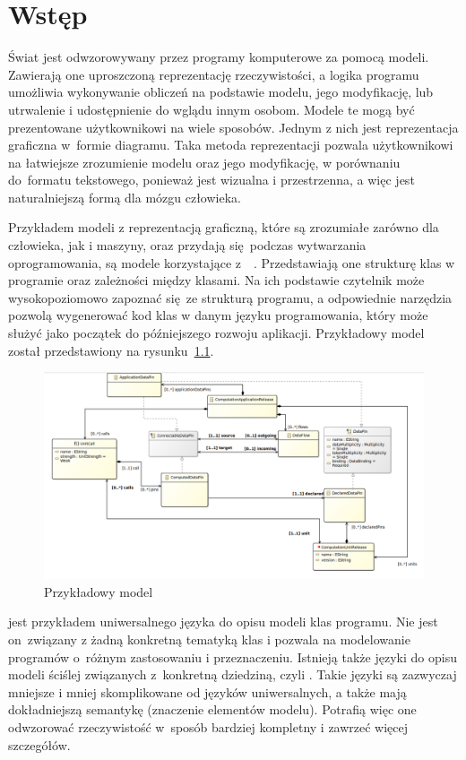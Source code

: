 \chapter{Wstęp}

Świat jest odwzorowywany przez programy komputerowe za pomocą modeli.
Zawierają one uproszczoną reprezentację rzeczywistości, a logika programu
umożliwia wykonywanie obliczeń na podstawie modelu, jego modyfikację, lub
utrwalenie i udostępnienie do wglądu innym osobom.
Modele te mogą być prezentowane użytkownikowi na wiele sposobów. Jednym z nich
jest reprezentacja graficzna w~formie diagramu. Taka metoda reprezentacji
pozwala użytkownikowi na łatwiejsze zrozumienie modelu
oraz jego modyfikację, w porównaniu do~formatu tekstowego, ponieważ jest
wizualna i przestrzenna, a więc jest naturalniejszą formą dla mózgu człowieka.

Przykładem modeli z reprezentacją graficzną, które są zrozumiałe zarówno dla
człowieka, jak i maszyny, oraz
przydają się podczas wytwarzania oprogramowania, są modele korzystające
z~~\cite{wikipedia-uml}. Przedstawiają
one strukturę klas w programie oraz zależności między klasami. Na ich podstawie
czytelnik może wysokopoziomowo zapoznać się~ze strukturą programu, a
odpowiednie narzędzia pozwolą wygenerować kod klas w danym języku
programowania, który może służyć jako początek do późniejszego rozwoju
aplikacji. Przykładowy model  został przedstawiony na
rysunku~\ref{rys:przykladowy-model-uml}.

\begin{figure}[!ht]
	\centering
	\includegraphics[width=0.95\linewidth]{./images/example-uml-model.png}
	\caption{Przykładowy model
		}\label{rys:przykladowy-model-uml}
\end{figure}

 jest przykładem uniwersalnego języka do opisu modeli klas
programu.
Nie jest on~związany z żadną konkretną tematyką klas i pozwala na modelowanie
programów o~różnym zastosowaniu i przeznaczeniu. Istnieją także języki do opisu
modeli ściślej związanych z~konkretną dziedziną, czyli . Takie
języki
są zazwyczaj mniejsze i mniej skomplikowane od języków uniwersalnych, a także
mają dokładniejszą semantykę (znaczenie elementów modelu). Potrafią więc one
odwzorować rzeczywistość w~sposób bardziej kompletny i zawrzeć więcej
szczegółów.

